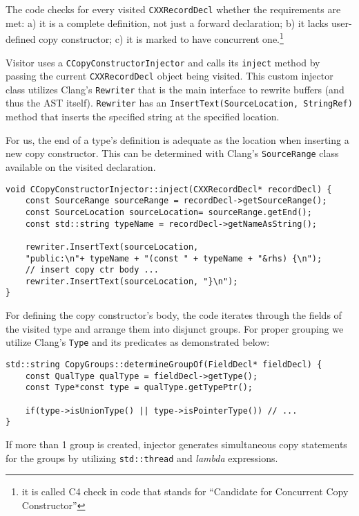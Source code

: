 \documentclass{article}
\begin{document}
The code checks for every visited \texttt{CXXRecordDecl} whether the requirements are met: a) it is a complete definition, not just a forward declaration; b) it lacks user-defined copy constructor; c) it is marked to have concurrent one.\footnote{it is called C4 check in code that stands for ``Candidate for Concurrent Copy Constructor''}

Visitor uses a \texttt{CCopyConstructorInjector} and calls its \texttt{inject} method by passing the current \texttt{CXXRecordDecl} object being visited. This custom injector class utilizes Clang's \texttt{Rewriter} that is the main interface to rewrite buffers (and thus the AST itself). \texttt{Rewriter} has an \texttt{InsertText(SourceLocation, StringRef)} method that inserts the specified string at the specified location.

For us, the end of a type's definition is adequate as the location when inserting a new copy constructor. This can be determined with Clang's \texttt{SourceRange} class available on the visited declaration.

\begin{verbatim}
void CCopyConstructorInjector::inject(CXXRecordDecl* recordDecl) {
    const SourceRange sourceRange = recordDecl->getSourceRange();
    const SourceLocation sourceLocation= sourceRange.getEnd();
    const std::string typeName = recordDecl->getNameAsString();
    
    rewriter.InsertText(sourceLocation,
    "public:\n"+ typeName + "(const " + typeName + "&rhs) {\n");
    // insert copy ctr body ...
    rewriter.InsertText(sourceLocation, "}\n");
}
\end{verbatim}

For defining the copy constructor's body, the code iterates through the fields of the visited type and arrange them into disjunct groups. For proper grouping we utilize Clang's \texttt{Type} and its predicates as demonstrated below:

\begin{verbatim}
std::string CopyGroups::determineGroupOf(FieldDecl* fieldDecl) {
    const QualType qualType = fieldDecl->getType();
    const Type*const type = qualType.getTypePtr();
    
    if(type->isUnionType() || type->isPointerType()) // ...
}
\end{verbatim}

If more than 1 group is created, injector generates simultaneous copy statements for the groups by utilizing \texttt{std::thread} and \emph{lambda} expressions.
\end{document}
